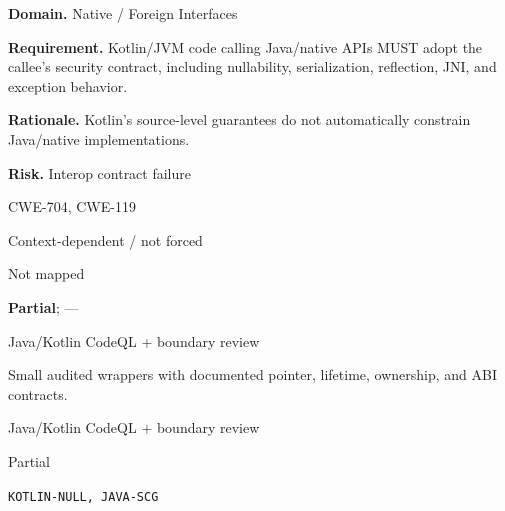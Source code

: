 \documentclass[10pt,letterpaper]{article}
\newcommand{\prioritybadge}[2]{\tcbox[on line,boxrule=0pt,arc=1.2mm,boxsep=0.7mm,left=1mm,right=1mm,top=0.4mm,bottom=0.4mm,colback=#2!12,coltext=#2]{\scriptsize\bfseries #1}}
\begin{document}
\begin{rulebox}[title={\texttt{SCS-KOTLIN-FFI-001} \hfill \prioritybadge{Critical Control}{Critical}}]
\textbf{Domain.} Native / Foreign Interfaces

\textbf{Requirement.} Kotlin/JVM code calling Java/native APIs MUST adopt the callee's security contract, including nullability, serialization, reflection, JNI, and exception behavior.

\textbf{Rationale.} Kotlin's source-level guarantees do not automatically constrain Java/native implementations.

\textbf{Risk.} Interop contract failure

\begin{description}[leftmargin=2.65cm,labelwidth=2.3cm,style=nextline,itemsep=1pt,topsep=3pt]
  \item[CWE] CWE-704, CWE-119
  \item[OWASP] Context-dependent / not forced
  \item[CERT] Not mapped
  \item[CodeQL] \textbf{Partial}; ---
  \item[Enforcement] Java/Kotlin CodeQL + boundary review
  \item[Prevention] Small audited wrappers with documented pointer, lifetime, ownership, and ABI contracts.
  \item[Verification] Java/Kotlin CodeQL + boundary review
  \item[Automation] Partial
  \item[Sources] \texttt{KOTLIN-NULL, JAVA-SCG}
\end{description}
\end{rulebox}
\end{document}
